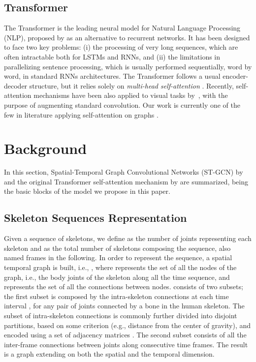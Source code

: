 \documentclass[review]{cvpr}
\begin{document}
\subsection{Transformer}\label{transformer}
The Transformer is the leading neural model for Natural Language Processing (NLP), proposed by \cite{attention} as an alternative to recurrent networks. It has been designed to face two key problems: (i) the processing of very long sequences, which are often intractable both for LSTMs and RNNs, and (ii) the limitations in parallelizing sentence processing, which is usually performed sequentially, word by word, in standard RNNs architectures. The Transformer follows a usual encoder-decoder structure, but it relies solely on \textit{multi-head self-attention} \cite{attention}. Recently, self-attention mechanisms have been also applied to visual tasks by~\cite{DBLP:journals/corr/abs-1904-09925}, with the purpose of augmenting standard convolution. Our work is currently one of the few in literature applying self-attention on graphs \cite{li2019graph}.


\section{Background}
In this section, Spatial-Temporal Graph Convolutional Networks (ST-GCN) by \cite{yan2018spatial} and the original Transformer self-attention mechanism by \cite{attention} are summarized, being the basic blocks of the model we propose in this paper.

\subsection{Skeleton Sequences Representation}

Given a sequence of skeletons, we define  as the number of joints representing each skeleton and  as the total number of skeletons composing the sequence, also named frames in the following.
In order to represent the sequence, a spatial temporal graph is built, i.e., , where  represents the set of all the nodes  of the graph, i.e., the body joints of the skeleton along all the time sequence, and  represents the set of all the connections between nodes.  consists of two subsets; the first subset  is composed by the intra-skeleton connections at each time interval , for any pair of joints  connected by a bone in the human skeleton. The subset  of intra-skeleton connections is commonly further divided into  disjoint partitions, based on some criterion \cite{yan2018spatial} (e.g., distance from the center of gravity), and encoded using a set of adjacency matrices . The second subset  consists of all the inter-frame connections between joints along consecutive time frames. The result is a graph extending on both the spatial and the temporal dimension.
\end{document}
